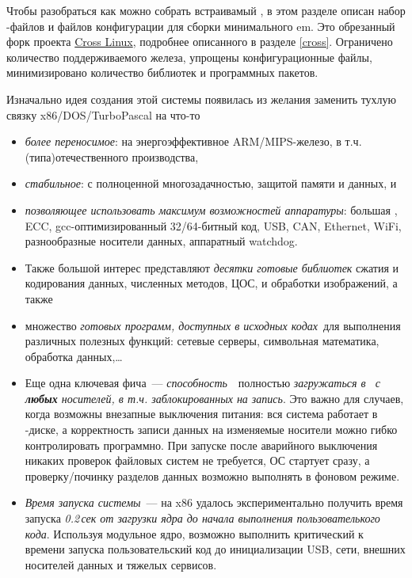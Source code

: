 \secdown

Чтобы разобраться как можно собрать встраивамый \linux, в этом разделе описан
набор \make-файлов и файлов конфигурации для сборки минимального em\linux.
Это обрезанный форк проекта \href{https://github.com/user/cross}{Cross
Linux}, подробнее описанного в разделе \ref{cross}. Ограничено количество
поддерживаемого железа, упрощены конфигурационные файлы, минимизировано
количество библиотек и программных пакетов.

\bigskip 

Изначально идея создания этой системы появилась из желания заменить тухлую
связку x86/DOS/Tur\-bo\-Pas\-cal на что-то

\begin{itemize}
  \item \emph{более переносимое}: на
 энергоэффективное ARM/MIPS-железо, в т.ч. (типа)отечественного производства,
\item \emph{стабильное}: с полноценной многозадачностью,
защитой памяти и данных, и
\item \emph{позволяющее использовать максимум возможностей аппаратуры}: большая
\ram, ECC, gcc-оп\-ти\-ми\-зи\-ро\-ван\-ный 32/64-битный код, USB, CAN, Ethernet,
WiFi, разнообразные носители данных, аппаратный watchdog.

\item Также большой интерес представляют \emph{десятки готовые библиотек} сжатия
и кодирования данных, численных методов, ЦОС, и обработки изображений, а также

\item множество \emph{готовых программ, доступных в исходных кодах}\ для выполнения различных полезных функций: сетевые серверы,
символьная математика, обработка данных,\ldots

\item Еще одна ключевая фича\ --- \emph{способность}\ \linux\ полностью
\emph{загружаться в \ram\ с \textbf{любых} носителей, в т.ч. заблокированных на
запись}. Это важно для случаев, когда возможны внезапные выключения питания:
вся система работает в \ram-диске, а корректность записи данных на изменяемые
носители можно гибко контролировать программно. При запуске после аварийного
выключения никаких проверок файловых систем не требуется, ОС стартует сразу, а
проверку/починку разделов данных возможно выполнять в фоновом режиме.

\item \emph{Время запуска системы}\ --- на x86 удалось экспериментально получить
время запуска \emph{0.2\,сек от загрузки ядра до начала выполнения
пользователького кода}.
Используя модульное ядро, возможно выполнить критический к времени запуска
пользовательский код до инициализации USB, сети, внешних носителей данных и
тяжелых сервисов.

\end{itemize}

